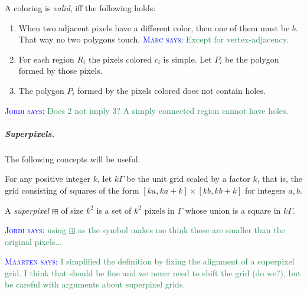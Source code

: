 \documentclass[a4paper,UKenglish,cleveref]{lipics-v2019}
\newcommand{\mremark}[3]{\textcolor{blue}{\textsc{#1 #2:}} \textcolor{SeaGreen}{\textsf{#3}}}
\newcommand{\maarten}[2][says]{\mremark{Maarten}{#1}{#2}}
\newcommand{\marc}[2][says]{\mremark{Marc}{#1}{#2}}
\newcommand{\jerome}[2][says]{\mremark{J\'er\^ome}{#1}{#2}}
\newcommand{\jordi}[2][says]{\mremark{Jordi}{#1}{#2}}
\newcommand{\spix}{\boxplus}
\begin{document}
\begin{definition}
A coloring is \emph{valid}, iff the following holds:
\begin{enumerate}
	\item When two adjacent pixels have a different color, then one of them must be $b$. That way no two polygons touch. \marc{Except for vertex-adjacency.}
	\item For each region $R_i$ the pixels colored $c_i$ is simple. Let $P_i$ be the polygon formed by those pixels.
	\item The polygon $P_i$ formed by the pixels colored does not contain holes.
\end{enumerate}

\jordi{Does 2 not imply 3? A simply connected region cannot have holes.}

\end{definition}


\subparagraph {Superpixels.}

The following concepts will be useful.

For any positive integer $k$, let $k\Gamma$ be the unit grid scaled by a factor $k$, that is, the grid consisting of squares of the form $[ka, ka+k] \times [kb, kb+k]$ for integers $a, b$.

\begin{definition}
A \emph{superpixel} $\spix$ of size $k^2$ is a set of $k^2$ pixels in $\Gamma$ whose union is a square in $k\Gamma$. %
\end{definition}

\jordi{using $\spix$ as the symbol makes me think these are smaller than the original pixels...}

\maarten {I simplified the definition by fixing the alignment of a superpixel grid. I think that should be fine and we never need to shift the grid (do we?), but be careful with arguments about superpixel grids.}
\end{document}
